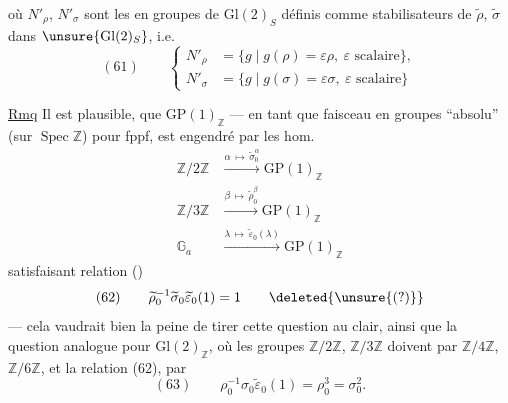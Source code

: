 
où $N'_\rho$, $N'_\sigma$ sont les  en groupes de $\mathrm{Gl}(2)_S$ définis   comme stabilisateurs de $\widetilde\rho$, $\widetilde\sigma$ dans $\unsure{\mathrm{Gl}(2)_S}$, i.e.
\[
(61)\qquad
\left\{\begin{aligned}
N'_\rho&=\{g\mid g(\rho)=\varepsilon\rho,\ \varepsilon\text{ scalaire}\},\\
N'_\sigma&=\{g\mid g(\sigma)=\varepsilon\sigma,\ \varepsilon\text{ scalaire}\}
\end{aligned}\right.
\]

\uline{Rmq} Il est plausible,   que $\mathrm{GP}(1)_{\mathbb Z}$ --- en tant que faisceau en groupes ``absolu'' (sur $\operatorname{Spec}\mathbb Z$) pour fppf, est engendré par les hom.
\[
\begin{aligned}
\mathbb Z/2\mathbb Z&\xrightarrow{\alpha\,\mapsto\,\widetilde\sigma_0^{\alpha}}\mathrm{GP}(1)_{\mathbb Z}\\
\mathbb Z/3\mathbb Z&\xrightarrow{\beta\,\mapsto\,\widetilde\rho_0^{\beta}}\mathrm{GP}(1)_{\mathbb Z}\\
\mathbb G_a&\xrightarrow{\lambda\,\mapsto\,\widetilde\varepsilon_0(\lambda)}\mathrm{GP}(1)_{\mathbb Z}
\end{aligned}
\]
satisfaisant   relation ()
\[
(62)\qquad \widetilde\rho_0^{-1}\widetilde\sigma_0\widetilde\varepsilon_0(1)=1
\qquad\deleted{\unsure{(?)}}
\]
--- cela vaudrait bien la peine de tirer cette question au clair, ainsi que la question analogue pour $\mathrm{Gl}(2)_{\mathbb Z}$, où les  groupes $\mathbb Z/2\mathbb Z$, $\mathbb Z/3\mathbb Z$ doivent  par $\mathbb Z/4\mathbb Z$, $\mathbb Z/6\mathbb Z$, et la relation (62), par
\[
(63)\qquad \rho_0^{-1}\sigma_0\widetilde\varepsilon_0(1)=\rho_0^3=\sigma_0^2.
\]


